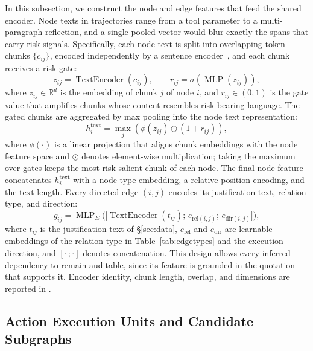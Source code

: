 In this subsection, we construct the node and edge features that feed the shared encoder. Node texts in trajectories range from a tool parameter to a multi-paragraph reflection, and a single pooled vector would blur exactly the spans that carry risk signals. Specifically, each node text is split into overlapping token chunks $\{c_{ij}\}$, encoded independently by a sentence encoder~\cite{reimers2019sentencebert,gao2021simcse}, and each chunk receives a risk gate:
\begin{equation}
z_{ij}=\operatorname{TextEncoder}(c_{ij}),\qquad
r_{ij}=\sigma(\operatorname{MLP}(z_{ij})),
\label{eq:riskgate}
\end{equation}
where $z_{ij}\in\mathbb{R}^{d}$ is the embedding of chunk $j$ of node $i$, and $r_{ij}\in(0,1)$ is the gate value that amplifies chunks whose content resembles risk-bearing language. The gated chunks are aggregated by max pooling into the node text representation:
\begin{equation}
h_i^{\mathrm{text}}=\max_j\!\left(\phi(z_{ij})\odot(1+r_{ij})\right),
\label{eq:chunkpool}
\end{equation}
where $\phi(\cdot)$ is a linear projection that aligns chunk embeddings with the node feature space and $\odot$ denotes element-wise multiplication; taking the maximum over gates keeps the most risk-salient chunk of each node. The final node feature concatenates $h_i^{\mathrm{text}}$ with a node-type embedding, a relative position encoding, and the text length. Every directed edge $(i,j)$ encodes its justification text, relation type, and direction:
\begin{equation}
g_{ij}=\operatorname{MLP}_E\!\big(\big[\operatorname{TextEncoder}(t_{ij});\,e_{\mathrm{rel}(i,j)};\,e_{\mathrm{dir}(i,j)}\big]\big),
\label{eq:edgefeat}
\end{equation}
where $t_{ij}$ is the justification text of \S\ref{sec:data}, $e_{\mathrm{rel}}$ and $e_{\mathrm{dir}}$ are learnable embeddings of the relation type in Table~\ref{tab:edgetypes} and the execution direction, and $[\cdot\,;\cdot]$ denotes concatenation. This design allows every inferred dependency to remain auditable, since its feature is grounded in the quotation that supports it. Encoder identity, chunk length, overlap, and dimensions are reported in .

\subsection{Action Execution Units and Candidate Subgraphs}

